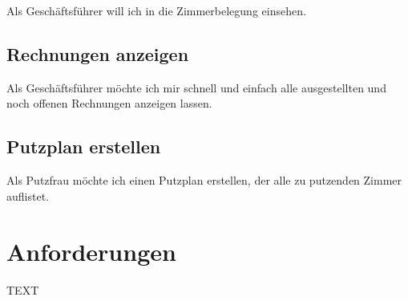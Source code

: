 \documentclass[11pt]{scrartcl}
\begin{document}
Als Geschäftsführer will ich in die Zimmerbelegung einsehen.

\subsection{Rechnungen anzeigen}

Als Geschäftsführer möchte ich mir schnell und einfach alle ausgestellten und noch offenen Rechnungen anzeigen lassen.

\subsection{Putzplan erstellen}

Als Putzfrau möchte ich einen Putzplan erstellen, der alle zu putzenden Zimmer auflistet.

\section{Anforderungen}

TEXT
\end{document}
